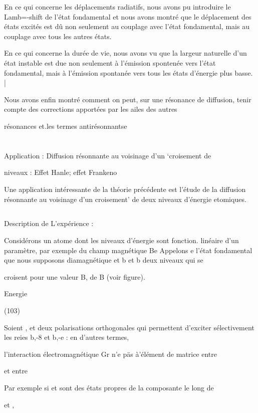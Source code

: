 En ce qui concerne les déplacements radiatifs, nous avons pu
introduire le Lamb=-shift de l'état fondamental et nous avons montré que le
déplacement des états excités est dû non seulement au couplage avec l'état
fondamental, mais au couplage avec tous les autres états.

En ce qui concerne la durée de vie, nous avons vu que la largeur naturelle d'un état instable est due non seulement à l'émission spontenée vers l'état fondamental, mais à l'émission spontanée vers tous les états
d'énergie plus basse. |

Nous avons enfin montré comment on peut, sur une résonance de
diffusion, tenir compte des corrections apportées par les ailes des autres

résonances et.les termes antirésonnantse

\section{} Application : Diffusion résonnante au voisinage d'un ‘croisement de%

niveaux : Effet Hanle; effet Frankeno

Une application intéressante de la théorie précédente est l'étude
de la diffusion résonnante au voisinage d'un croisement’ de deux niveaux d'énergie etomiques.

\subsection{} Description de L'expérience :%

Considérons un atome dont les niveaux d'énergie sont fonction.
linéaire d'un paramètre, par exemple du champ magnétique Be Appelons e l'état
fondamental que nous supposons diamagnétique et b et b deux niveaux qui se

croisent pour une valeur B, de B (voir figure).

Energie

(103)

Soient , et  deux polarisations orthogonales qui permettent d'exciter sélectivement les reies b,-8 et b,-e : en d'autres termes,

l'interaction électromagnétique Gr n'e päs à'élément de matrice entre

 et entre

Par exemple si  et  sont des états propres de la composante le long de

et ,

